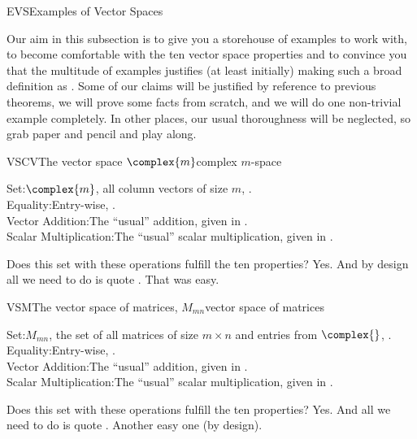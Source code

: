 %
\begin{subsect}{EVS}{Examples of Vector Spaces}
%
\begin{para}Our aim in this subsection is to give you a storehouse of examples to work with, to become comfortable with the ten vector space properties and to convince you that the multitude of examples justifies (at least initially) making such a broad definition as .  Some of our claims will be justified by reference to previous theorems, we will prove some facts from scratch, and we will do one non-trivial example completely.  In other places, our usual thoroughness will be neglected, so grab paper and pencil and play along.\end{para}
%
\begin{example}{VSCV}{The vector space $\complex{m}$}{complex $m$-space}
\begin{para}Set:\quad $\complex{m}$, all column vectors of size $m$, .\\
Equality:\quad Entry-wise, .\\
Vector Addition:\quad  The ``usual'' addition, given in .\\
Scalar Multiplication:\quad The ``usual'' scalar multiplication, given in .\end{para}
%
\begin{para}Does this set with these operations fulfill the ten properties?  Yes.  And by design all we need to do is quote .  That was easy.\end{para}
\end{example}
%
\begin{example}{VSM}{The vector space of matrices, $M_{mn}$}{vector space of matrices}
\begin{para}Set:\quad $M_{mn}$, the set of all matrices of size $m\times n$ and entries from $\complex{\null}$, .\\
Equality:\quad Entry-wise, .\\
Vector Addition:\quad  The ``usual'' addition, given in .\\
Scalar Multiplication:\quad The ``usual'' scalar multiplication, given in .\end{para}
%
\begin{para}Does this set with these operations fulfill the ten properties?  Yes.  And all we need to do is quote .  Another easy one (by design).\end{para}

\end{example}
\end{subsect}
